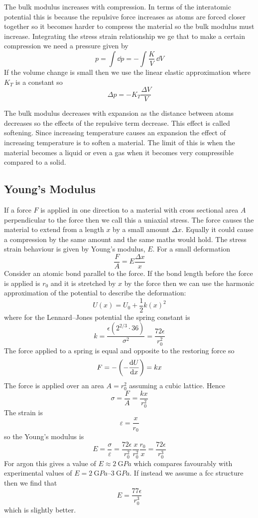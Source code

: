     The bulk modulus increases with compression.
    In terms of the interatomic potential this is because the repulsive force increases as atoms are forced closer together so it becomes harder to compress the material so the bulk modulus must increase.
    Integrating the stress strain relationship we ge that to make a certain compression we need a pressure given by
    \[p = \int\dd p = -\int\frac{K}{V}\,\dd V\]
    If the volume change is small then we use the linear elastic approximation where \(K_T\) is a constant so
    \[\Delta p = -K_T\frac{\Delta V}{V}\]
    
    The bulk modulus decreases with expansion as the distance between atoms decreases so the effects of the repulsive term decrease.
    This effect is called softening.
    Since increasing temperature causes an expansion the effect of increasing temperature is to soften a material.
    The limit of this is when the material becomes a liquid or even a gas when it becomes very compressible compared to a solid.
    
    \subsection{Young's Modulus}
    If a force \(F\) is applied in one direction to a material with cross sectional area \(A\) perpendicular to the force then we call this a uniaxial stress.
    The force causes the material to extend from a length \(x\) by a small amount \(\Delta x\).
    Equally it could cause a compression by the same amount and the same maths would hold.
    The stress strain behaviour is given by Young's modulus, \(E\).
    For a small deformation
    \[\frac{F}{A} = E\frac{\Delta x}{x}\]
    Consider an atomic bond parallel to the force.
    If the bond length before the force is applied is \(r_0\) and it is stretched by \(x\) by the force then we can use the harmonic approximation of the potential to describe the deformation:
    \[U(x) = U_0 + \frac{1}{2}k(x)^2\]
    where for the Lennard--Jones potential the spring constant is
    \[k = \frac{\epsilon(2^{2/3}\cdot 36)}{\sigma^2} = \frac{72\epsilon}{r_0^2}\]
    The force applied to a spring is equal and opposite to the restoring force so
    \[F = -\left(-\dv{U}{x}\right) = kx\]
    The force is applied over an area \(A = r_0^2\) assuming a cubic lattice.
    Hence
    \[\sigma = \frac{F}{A} = \frac{kx}{r_0^2}\]
    The strain is
    \[\varepsilon = \frac{x}{r_0}\]
    so the Young's modulus is
    \[E = \frac{\sigma}{\varepsilon} = \frac{72\epsilon}{r_0^2}\frac{x}{r_0^2}\frac{r_0}{x} = \frac{72\epsilon}{r_0^3}\]
    For argon this gives a value of \(E\approx\SI{2}{\giga Pa}\) which compares favourably with experimental values of \(E = \SIrange[range-phrase=-]{2}{3}{\giga Pa}\).
    If instead we assume a fcc structure then we find that
    \[E = \frac{77\epsilon}{r_0^3}\]
    which is slightly better.
    
